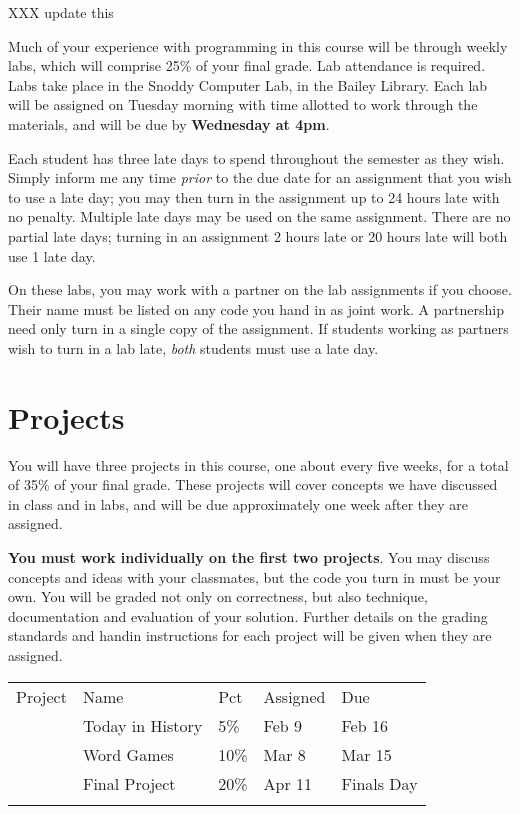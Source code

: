 \documentclass{article}
\begin{document}
XXX update this

Much of your experience with programming in this course will be
through weekly labs, which will comprise 25\% of your final grade. Lab
attendance is required. Labs take place in the Snoddy Computer Lab, in
the Bailey Library.  Each lab will be assigned on Tuesday morning
with time allotted to work through the materials, and will be due by
\textbf{Wednesday at 4pm}.

Each student has three late days to spend throughout the semester as
they wish.  Simply inform me any time \emph{prior} to the due date for an
assignment that you wish to use a late day; you may then turn in the
assignment up to 24 hours late with no penalty.  Multiple late days
may be used on the same assignment.  There are no partial late days;
turning in an assignment 2 hours late or 20 hours late will both use 1
late day.

On these labs, you may work with a partner on the lab assignments if
you choose. Their name must be listed on any code you hand in as joint
work.  A partnership need only turn in a single copy of the
assignment.  If students working as partners wish to turn in a lab
late, \emph{both} students must use a late day.

\section*{Projects}

You will have three projects in this course, one about every five weeks,
for a total of 35\% of your final grade. These projects will cover
concepts we have discussed in class and in labs, and will be due
approximately one week after they are assigned.

\textbf{You must work individually on the first two projects}. You may
discuss concepts and ideas with your classmates, but the code you turn
in must be your own. You will be graded not only on correctness, but
also technique, documentation and evaluation of your solution. Further
details on the grading standards and handin instructions for each
project will be given when they are assigned.

\begin{longtable}[c]{@{}lllll@{}}
\toprule\addlinespace
Project & Name & Pct & Assigned & Due
\\\addlinespace
\midrule\endhead
1 & Today in History & 5\% & Feb 9 & Feb
16
\\\addlinespace
2 & Word Games & 10\% & Mar 8 & Mar 15
\\\addlinespace
3 & Final Project & 20\% & Apr 11 & Finals Day
\\\addlinespace
\bottomrule
\end{longtable}
\end{document}
